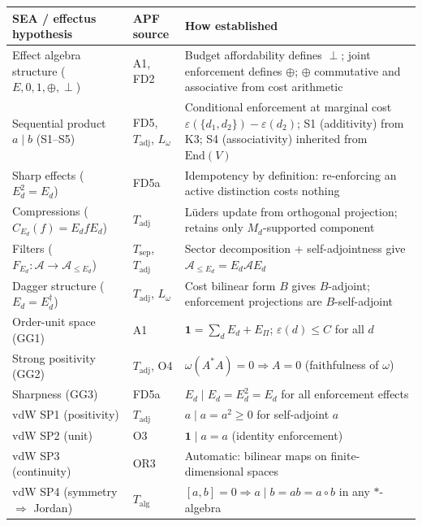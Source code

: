\documentclass[11pt,a4paper]{article}
\theoremstyle{definition}
\newcommand{\eps}{\varepsilon}
\newcommand{\End}{\mathrm{End}}
\begin{document}
\smallskip
\begin{center}\small
\renewcommand{\arraystretch}{1.2}
\begin{tabular}{@{}p{3.4cm}p{3cm}p{5.5cm}@{}}
\toprule
\textbf{SEA / effectus hypothesis} & \textbf{APF source} & \textbf{How established} \\
\midrule
Effect algebra structure ($E, 0, 1, \oplus, \perp$) & A1, FD2 & Budget affordability defines $\perp$; joint enforcement defines $\oplus$; $\oplus$ commutative and associative from cost arithmetic \\
Sequential product $a \mid b$ (S1--S5) & FD5, $T_{\mathrm{adj}}$, $L_\omega$ & Conditional enforcement at marginal cost $\eps(\{d_1,d_2\})-\eps(d_2)$; S1 (additivity) from K3; S4 (associativity) inherited from $\End(V)$ \\
Sharp effects ($E_d^2 = E_d$) & FD5a & Idempotency by definition: re-enforcing an active distinction costs nothing \\
Compressions ($C_{E_d}(f) = E_d f E_d$) & $T_{\mathrm{adj}}$ & L\"uders update from orthogonal projection; retains only $M_d$-supported component \\
Filters ($F_{E_d}: \mathcal{A} \to \mathcal{A}_{\le E_d}$) & $T_{\mathrm{sep}}$, $T_{\mathrm{adj}}$ & Sector decomposition + self-adjointness give $\mathcal{A}_{\le E_d} = E_d \mathcal{A} E_d$ \\
Dagger structure ($E_d = E_d^\dagger$) & $T_{\mathrm{adj}}$, $L_\omega$ & Cost bilinear form $B$ gives $B$-adjoint; enforcement projections are $B$-self-adjoint \\
Order-unit space (GG1) & A1 & $\mathbf{1} = \sum_d E_d + E_\Pi$; $\eps(d) \le C$ for all $d$ \\
Strong positivity (GG2) & $T_{\mathrm{adj}}$, O4 & $\omega(A^*A) = 0 \Rightarrow A = 0$ (faithfulness of $\omega$) \\
Sharpness (GG3) & FD5a & $E_d \mid E_d = E_d^2 = E_d$ for all enforcement effects \\
vdW SP1 (positivity) & $T_{\mathrm{adj}}$ & $a \mid a = a^2 \ge 0$ for self-adjoint $a$ \\
vdW SP2 (unit) & O3 & $\mathbf{1} \mid a = a$ (identity enforcement) \\
vdW SP3 (continuity) & OR3 & Automatic: bilinear maps on finite-dimensional spaces \\
vdW SP4 (symmetry $\Rightarrow$ Jordan) & $T_{\mathrm{alg}}$ & $[a,b] = 0 \Rightarrow a \mid b = ab = a \circ b$ in any $*$-algebra \\
\bottomrule
\end{tabular}
\end{center}
\smallskip
\end{document}
